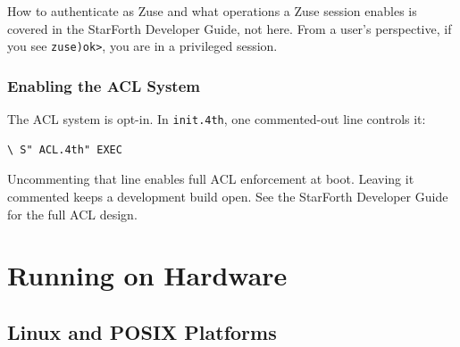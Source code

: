 How to authenticate as Zuse and what operations a Zuse session enables is
covered in the StarForth Developer Guide, not here. From a user's perspective,
if you see \texttt{zuse)ok>}, you are in a privileged session.

\section{Enabling the ACL System}
\label{sec:acl-enable}

The ACL system is opt-in. In \texttt{init.4th}, one commented-out line
controls it:

\begin{lstlisting}[language=Forth]
\ S" ACL.4th" EXEC
\end{lstlisting}

Uncommenting that line enables full ACL enforcement at boot. Leaving it
commented keeps a development build open. See the StarForth Developer Guide
for the full ACL design.







\part{Running on Hardware}

\chapter{Linux and POSIX Platforms}
\label{chap:linux}

